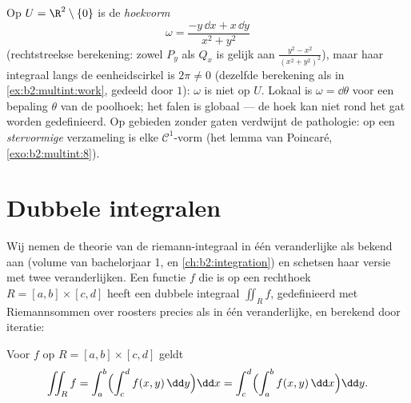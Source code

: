 \begin{example}\label{ex:b2:multint:angleform}
Op $U = \R^2 \setminus \{0\}$ is de \emph{hoekvorm}
\[
\omega = \frac{-y\,\dd x + x\,\dd y}{x^2 + y^2}
\]
 (rechtstreekse berekening: zowel $P_y$ als $Q_x$ is gelijk
aan $\frac{y^2 - x^2}{(x^2+y^2)^2}$), maar haar integraal langs de
eenheidscirkel is $2\pi \neq 0$ (dezelfde berekening als in
\cref{ex:b2:multint:work}, gedeeld door $1$): $\omega$ is niet
 op $U$. Lokaal is $\omega = \dd\theta$ voor een bepaling
$\theta$ van de poolhoek; het falen is globaal --- de hoek kan niet
 rond het gat worden gedefinieerd. Op gebieden zonder gaten
verdwijnt de pathologie: op een \emph{stervormige}  verzameling
is elke  $\mathcal{C}^1$-vorm  (het lemma van
Poincaré, \cref{exo:b2:multint:8}).
\end{example}

\section{Dubbele integralen}

Wij nemen de theorie van de riemann-integraal in één veranderlijke
als bekend aan (volume van bachelorjaar 1, en
\cref{ch:b2:integration}) en schetsen haar versie met twee
veranderlijken. Een functie $f$ die  is op een rechthoek $R
= [a, b] \times [c, d]$ heeft een dubbele integraal $\iint_R f$,
gedefinieerd met Riemannsommen over roosters precies als in één
veranderlijke, en berekend door iteratie:

\begin{theorem}\label{thm:b2:multint:fubini}
Voor $f$  op $R = [a,b] \times [c,d]$ geldt
\[
\iint_R f
= \int_a^b \Bigl(\int_c^d f(x, y)\,\dd y\Bigr)\dd x
= \int_c^d \Bigl(\int_a^b f(x, y)\,\dd x\Bigr)\dd y .
\]
\end{theorem}

